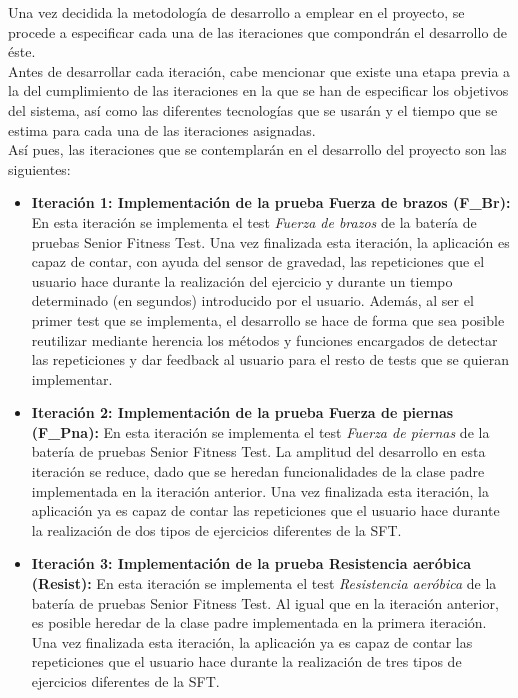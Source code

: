 Una vez decidida la metodología de desarrollo a emplear en el proyecto, se procede a especificar cada una de las iteraciones que compondrán el desarrollo de éste.\\

Antes de desarrollar cada iteración, cabe mencionar que existe una etapa previa a la del cumplimiento de las iteraciones en la que se han de especificar los objetivos del sistema, así como las diferentes tecnologías que se usarán y el tiempo que se estima para cada una de las iteraciones asignadas.\\

Así pues, las iteraciones que se contemplarán en el desarrollo del proyecto son las siguientes:

\begin{itemize}
\item \textbf{Iteración 1: Implementación de la prueba Fuerza de brazos (F\_Br):} En esta iteración se implementa el test \textit{Fuerza de brazos} de la batería de pruebas Senior Fitness Test. Una vez finalizada esta iteración, la aplicación es capaz de contar, con ayuda del sensor de gravedad, las repeticiones que el usuario hace durante la realización del ejercicio y durante un tiempo determinado (en segundos) introducido por el usuario. Además, al ser el primer test que se implementa, el desarrollo se hace de forma que sea posible reutilizar mediante herencia los métodos y funciones encargados de detectar las repeticiones y dar feedback al usuario para el resto de tests que se quieran implementar.
\item \textbf{Iteración 2: Implementación de la prueba Fuerza de piernas (F\_Pna):} En esta iteración se implementa el test \textit{Fuerza de piernas} de la batería de pruebas Senior Fitness Test. La amplitud del desarrollo en esta iteración se reduce, dado que se heredan funcionalidades de la clase padre implementada en la iteración anterior. Una vez finalizada esta iteración, la aplicación ya es capaz de contar las repeticiones que el usuario hace durante la realización de dos tipos de ejercicios diferentes de la SFT.
\item \textbf{Iteración 3: Implementación de la prueba Resistencia aeróbica (Resist):} En esta iteración se implementa el test \textit{Resistencia aeróbica} de la batería de pruebas Senior Fitness Test. Al igual que en la iteración anterior, es posible heredar de la clase padre implementada en la primera iteración. Una vez finalizada esta iteración, la aplicación ya es capaz de contar las repeticiones que el usuario hace durante la realización de tres tipos de ejercicios diferentes de la SFT.

\end{itemize}
